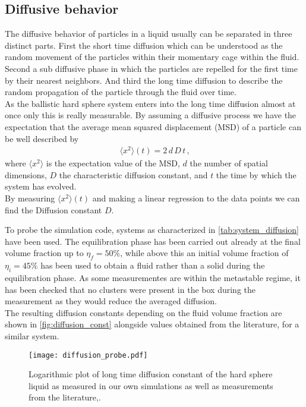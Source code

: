 \subsection{Diffusive behavior}
\label{sec:diffusion_probe}
The diffusive behavior of particles in a liquid usually can be separated in three distinct parts. First the short time diffusion which can be understood as the random movement of the particles within their momentary cage within the fluid. Second a sub diffusive phase in which the particles are repelled for the first time by their nearest neighbors. And third the long time diffusion to describe the random propagation of the particle through the fluid over time.\\
   
As the ballistic hard sphere system enters into the long time diffusion almost at once only this is really measurable. By assuming a diffusive process we have the expectation that the average mean squared displacement (MSD) of a particle can be well described by 
\begin{align}
\label{eqn:diffusion}
\langle x^2 \rangle(t) = 2 \, d \, D \, t  \, \text{,}
\end{align}
where $\langle x^2 \rangle$ is the expectation value of the MSD, $d$ the number of spatial dimensions, $D$ the characteristic diffusion constant, and $t$ the time by which the system has evolved.\\

By measuring $\langle x^2 \rangle (t)$ and making a linear regression to the data points we can find the Diffusion constant $D$.

To probe the simulation code, systems as characterized in \autoref{tab:system_diffusion} have been used. The equilibration phase has been carried out already at the final volume fraction up to $\eta_f = 50\%$, while above this an initial volume fraction of $\eta_i = 45\%$ has been used to obtain a fluid rather than a solid during the equilibration phase. As some measurementes are within the metastable regime, it has been checked that no clusters were present in the box during the measurement as they would reduce the averaged diffusion.\\

The resulting diffusion constants depending on the fluid volume fraction are shown in \autoref{fig:diffusion_const} alongside values obtained from the literature, for a similar system.\\

\begin{figure}[h]
\centering
\texttt{[image: diffusion\_probe.pdf]}
\caption[Long time diffusion constant at varying volume fractions]{Logarithmic plot of long time diffusion constant of the hard sphere liquid as measured in our own simulations as well as measurements from the literature\cite{Pieprzyk2019},\cite{Heyes2007}.}
\label{fig:diffusion_const}
\end{figure}

